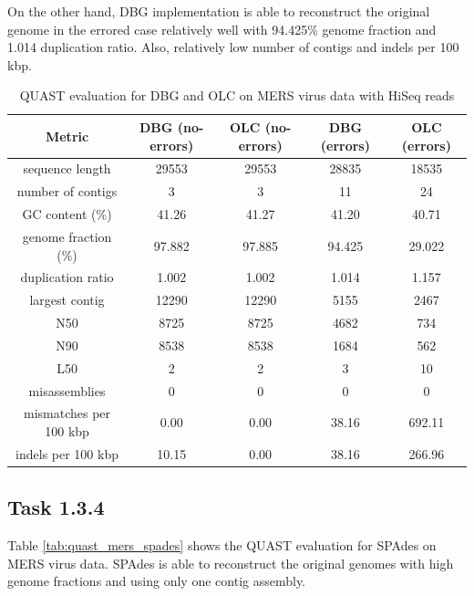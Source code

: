 \documentclass[12pt]{article}
\begin{document}
On the other hand, DBG implementation is able to reconstruct the original genome in the errored case relatively well with 94.425\% genome fraction and 1.014 duplication ratio. Also, relatively low number of contigs and indels per 100 kbp.

\begin{table}[h!]
\begin{center}
\begin{tabular}{ |c|c|c||c|c| }
    \hline
    Metric & DBG (no-errors) & OLC (no-errors) & DBG (errors) & OLC (errors) \\
    \hline
    sequence length        & 29553  & 29553  & 28835 & 18535 \\
    number of contigs      & 3      & 3      & 11 & 24 \\
    GC content (\%)        & 41.26  & 41.27  & 41.20 & 40.71 \\
    genome fraction (\%)   & 97.882 & 97.885 & 94.425 & 29.022 \\
    duplication ratio      & 1.002  & 1.002  & 1.014 & 1.157 \\
    largest contig         & 12290  & 12290  & 5155 & 2467 \\
    N50                    & 8725   & 8725   & 4682 & 734 \\
    N90                    & 8538   & 8538   & 1684 & 562 \\
    L50                    & 2      & 2      & 3 & 10 \\
    misassemblies          & 0      & 0 & 0  & 0 \\
    mismatches per 100 kbp & 0.00   & 0.00   & 38.16 & 692.11 \\
    indels per 100 kbp     & 10.15  & 0.00   & 38.16 & 266.96 \\
    \hline
\end{tabular}
\end{center}
\caption{QUAST evaluation for DBG and OLC on MERS virus data with HiSeq reads}
\label{tab:quast_mers_dbg_olc}
\end{table}

\subsection{Task 1.3.4}

Table \ref{tab:quast_mers_spades} shows the QUAST evaluation for SPAdes on MERS virus data. SPAdes is able to reconstruct the original genomes with high genome fractions and using only one contig assembly.
\end{document}

